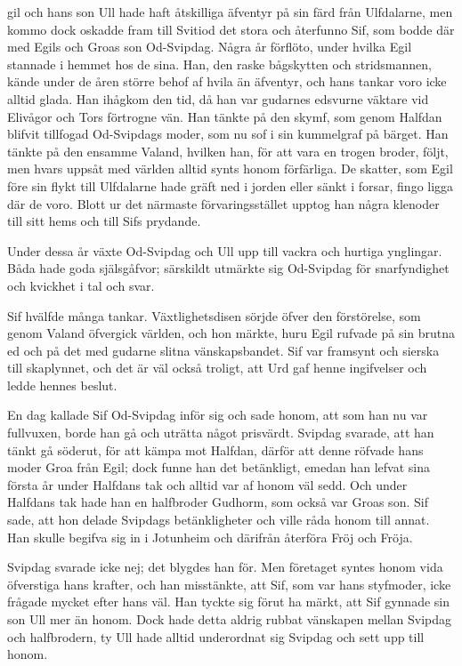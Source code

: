\endSecII


\dropcapE gil och hans son Ull hade haft åtskilliga äfventyr på sin färd från
Ulfdalarne, men kommo dock oskadde fram till Svitiod det stora och
återfunno Sif, som bodde där med Egils och Groas son Od-Svipdag. Några
år förflöto, under hvilka Egil stannade i hemmet hos de sina. Han, den
raske bågskytten och stridsmannen, kände under de åren större behof af
hvila än äfventyr, och hans tankar voro icke alltid glada. Han ihågkom
den tid, då han var gudarnes edsvurne väktare vid Elivågor och Tors
förtrogne vän. Han tänkte på den skymf, som genom Halfdan blifvit
tillfogad Od-Svipdags moder, som nu sof i sin kummelgraf på bärget. Han
tänkte på den ensamme Valand, hvilken han, för att vara en trogen
broder, följt, men hvars uppsåt med världen alltid synts honom
förfärliga. De skatter, som Egil före sin flykt till Ulfdalarne hade
gräft ned i jorden eller sänkt i forsar, fingo ligga där de voro. Blott
ur det närmaste förvaringsstället upptog han några klenoder till sitt
hems och till Sifs prydande.

Under dessa år växte Od-Svipdag och Ull upp till vackra och hurtiga
ynglingar. Båda hade goda själsgåfvor; särskildt utmärkte sig Od-Svipdag
för snarfyndighet och kvickhet i tal och svar.

Sif hvälfde många tankar. Växtlighetsdisen sörjde öfver den förstörelse,
som genom Valand öfvergick världen, och hon märkte, huru Egil rufvade på
sin brutna ed och på det
med gudarne slitna vänskapsbandet. Sif var framsynt och sierska till
skaplynnet, och det är väl också troligt, att Urd gaf henne ingifvelser
och ledde hennes beslut.

En dag kallade Sif Od-Svipdag inför sig och sade honom, att som han nu
var fullvuxen, borde han gå och uträtta något prisvärdt. Svipdag
svarade, att han tänkt gå söderut, för att kämpa mot Halfdan, därför att
denne röfvade hans moder Groa från Egil; dock funne han det betänkligt,
emedan han lefvat sina första år under Halfdans tak och alltid var af
honom väl sedd. Och under Halfdans tak hade han en halfbroder Gudhorm,
som också var Groas son. Sif sade, att hon delade Svipdags
betänkligheter och ville råda honom till annat. Han skulle begifva sig
in i Jotunheim och därifrån återföra Fröj och Fröja.

Svipdag svarade icke nej; det blygdes han för. Men företaget syntes
honom vida öfverstiga hans krafter, och han misstänkte, att Sif, som var
hans styfmoder, icke frågade mycket efter hans väl. Han tyckte sig förut
ha märkt, att Sif gynnade sin son Ull mer än honom. Dock hade detta
aldrig rubbat vänskapen mellan Svipdag och halfbrodern, ty Ull hade
alltid underordnat sig Svipdag och sett upp till honom.

